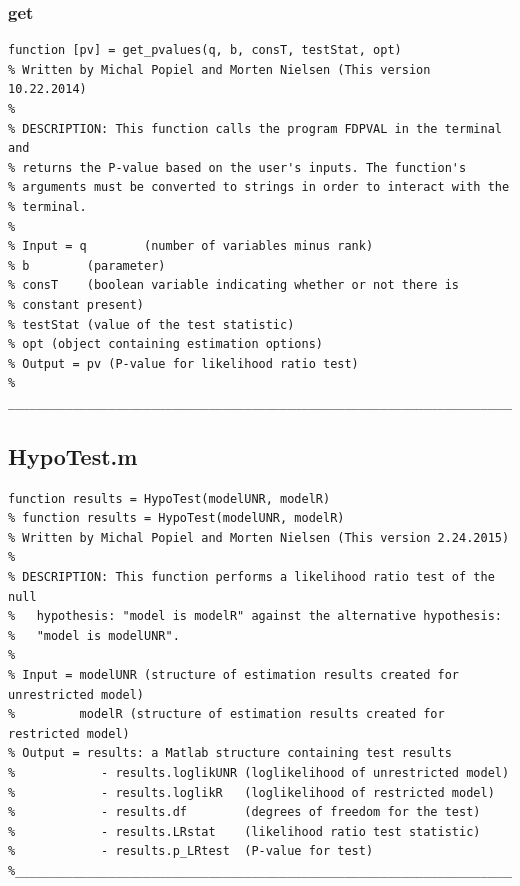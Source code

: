 \documentclass[10pt]{article}
\begin{document}
\subsubsection{get}
\label{sec:getpvals}
\begin{lstlisting}[frame=single,caption={get\textunderscore{pvalues}.m}]
function [pv] = get_pvalues(q, b, consT, testStat, opt)
% Written by Michal Popiel and Morten Nielsen (This version 10.22.2014)
% 
% DESCRIPTION: This function calls the program FDPVAL in the terminal and
% returns the P-value based on the user's inputs. The function's 
% arguments must be converted to strings in order to interact with the
% terminal. 
% 
% Input = q        (number of variables minus rank)
% b        (parameter)
% consT    (boolean variable indicating whether or not there is
% constant present)
% testStat (value of the test statistic)
% opt (object containing estimation options)
% Output = pv (P-value for likelihood ratio test)
% _________________________________________________________________________
\end{lstlisting}


\subsection{HypoTest.m}

\begin{lstlisting}[frame=single,caption={HypoTest.m}]
function results = HypoTest(modelUNR, modelR)
% function results = HypoTest(modelUNR, modelR)
% Written by Michal Popiel and Morten Nielsen (This version 2.24.2015)
% 
% DESCRIPTION: This function performs a likelihood ratio test of the null
% 	hypothesis: "model is modelR" against the alternative hypothesis:
% 	"model is modelUNR".
%
% Input = modelUNR (structure of estimation results created for unrestricted model)
%         modelR (structure of estimation results created for restricted model)
% Output = results: a Matlab structure containing test results
%            - results.loglikUNR (loglikelihood of unrestricted model)
%            - results.loglikR   (loglikelihood of restricted model)
%            - results.df        (degrees of freedom for the test)
%            - results.LRstat    (likelihood ratio test statistic)
%            - results.p_LRtest  (P-value for test)
%_________________________________________________________________________
\end{lstlisting}
\end{document}
